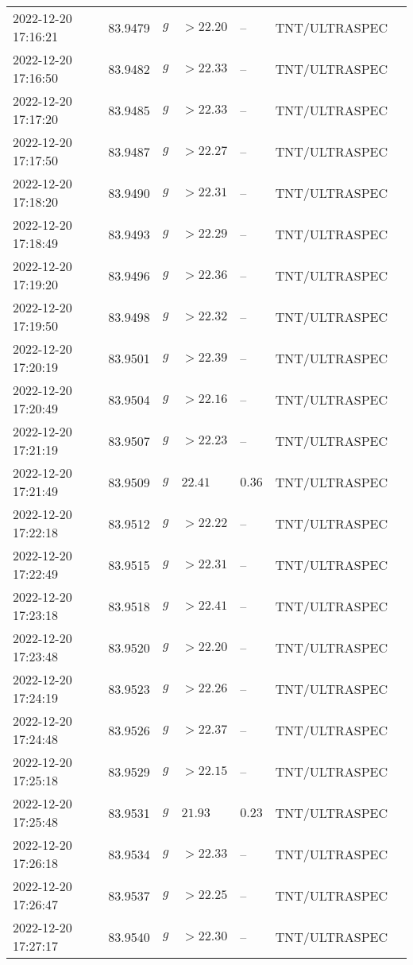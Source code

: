 \documentclass{nature_plusfigure}
\begin{document}
\begin{supplement}
\begin{center}
\begin{longtable}{lllllll}
2022-12-20 17:16:21 & 83.9479 & $g$ & $>22.20$ & -- & TNT/ULTRASPEC &  \\ 
2022-12-20 17:16:50 & 83.9482 & $g$ & $>22.33$ & -- & TNT/ULTRASPEC &  \\ 
2022-12-20 17:17:20 & 83.9485 & $g$ & $>22.33$ & -- & TNT/ULTRASPEC &  \\ 
2022-12-20 17:17:50 & 83.9487 & $g$ & $>22.27$ & -- & TNT/ULTRASPEC &  \\ 
2022-12-20 17:18:20 & 83.9490 & $g$ & $>22.31$ & -- & TNT/ULTRASPEC &  \\ 
2022-12-20 17:18:49 & 83.9493 & $g$ & $>22.29$ & -- & TNT/ULTRASPEC &  \\ 
2022-12-20 17:19:20 & 83.9496 & $g$ & $>22.36$ & -- & TNT/ULTRASPEC &  \\ 
2022-12-20 17:19:50 & 83.9498 & $g$ & $>22.32$ & -- & TNT/ULTRASPEC &  \\ 
2022-12-20 17:20:19 & 83.9501 & $g$ & $>22.39$ & -- & TNT/ULTRASPEC &  \\ 
2022-12-20 17:20:49 & 83.9504 & $g$ & $>22.16$ & -- & TNT/ULTRASPEC &  \\ 
2022-12-20 17:21:19 & 83.9507 & $g$ & $>22.23$ & -- & TNT/ULTRASPEC &  \\ 
2022-12-20 17:21:49 & 83.9509 & $g$ & $22.41$ & $0.36$ & TNT/ULTRASPEC &  \\ 
2022-12-20 17:22:18 & 83.9512 & $g$ & $>22.22$ & -- & TNT/ULTRASPEC &  \\ 
2022-12-20 17:22:49 & 83.9515 & $g$ & $>22.31$ & -- & TNT/ULTRASPEC &  \\ 
2022-12-20 17:23:18 & 83.9518 & $g$ & $>22.41$ & -- & TNT/ULTRASPEC &  \\ 
2022-12-20 17:23:48 & 83.9520 & $g$ & $>22.20$ & -- & TNT/ULTRASPEC &  \\ 
2022-12-20 17:24:19 & 83.9523 & $g$ & $>22.26$ & -- & TNT/ULTRASPEC &  \\ 
2022-12-20 17:24:48 & 83.9526 & $g$ & $>22.37$ & -- & TNT/ULTRASPEC &  \\ 
2022-12-20 17:25:18 & 83.9529 & $g$ & $>22.15$ & -- & TNT/ULTRASPEC &  \\ 
2022-12-20 17:25:48 & 83.9531 & $g$ & $21.93$ & $0.23$ & TNT/ULTRASPEC &  \\ 
2022-12-20 17:26:18 & 83.9534 & $g$ & $>22.33$ & -- & TNT/ULTRASPEC &  \\ 
2022-12-20 17:26:47 & 83.9537 & $g$ & $>22.25$ & -- & TNT/ULTRASPEC &  \\ 
2022-12-20 17:27:17 & 83.9540 & $g$ & $>22.30$ & -- & TNT/ULTRASPEC &  \\ 

\end{longtable}
\end{center}
\end{supplement}
\end{document}
